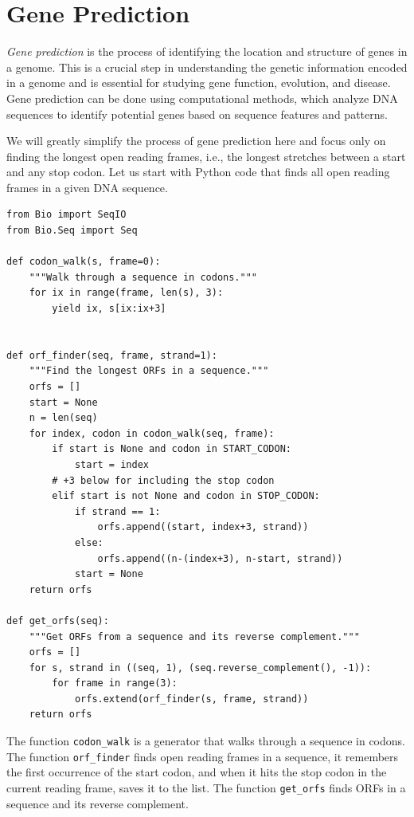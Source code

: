 \section{Gene Prediction}

{\em Gene prediction} is the process of identifying the location and structure of genes in a genome. This is a crucial step in understanding the genetic information encoded in a genome and is essential for studying gene function, evolution, and disease. Gene prediction can be done using computational methods, which analyze DNA sequences to identify potential genes based on sequence features and patterns.

We will greatly simplify the process of gene prediction here and focus only on finding the longest open reading frames, i.e., the longest stretches between a start and any stop codon. Let us start with Python code that finds all open reading frames in a given DNA sequence.

\vspace*{3mm}
\begin{lstlisting}
from Bio import SeqIO
from Bio.Seq import Seq

def codon_walk(s, frame=0):
    """Walk through a sequence in codons."""
    for ix in range(frame, len(s), 3):
        yield ix, s[ix:ix+3]


def orf_finder(seq, frame, strand=1):
    """Find the longest ORFs in a sequence."""
    orfs = []
    start = None
    n = len(seq)
    for index, codon in codon_walk(seq, frame):
        if start is None and codon in START_CODON:
            start = index
        # +3 below for including the stop codon
        elif start is not None and codon in STOP_CODON:
            if strand == 1:
                orfs.append((start, index+3, strand))
            else:
                orfs.append((n-(index+3), n-start, strand))
            start = None
    return orfs

def get_orfs(seq):
    """Get ORFs from a sequence and its reverse complement."""
    orfs = []
    for s, strand in ((seq, 1), (seq.reverse_complement(), -1)):
        for frame in range(3):
            orfs.extend(orf_finder(s, frame, strand))
    return orfs
\end{lstlisting}

The function \texttt{codon\_walk} is a generator that walks through a sequence in codons. The function \texttt{orf\_finder} finds open reading frames in a sequence, it remembers the first occurrence of the start codon, and when it hits the stop codon in the current reading frame, saves it to the list. The function \texttt{get\_orfs} finds ORFs in a sequence and its reverse complement.

